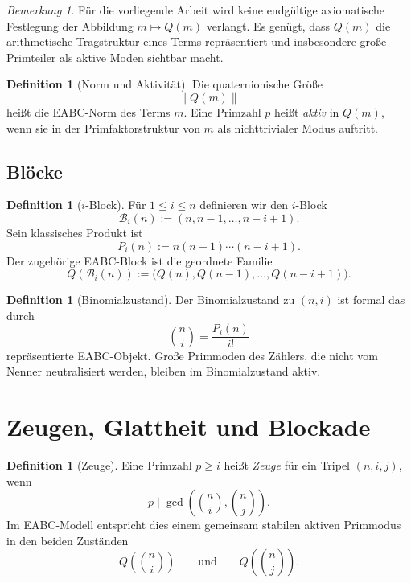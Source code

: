 \documentclass[12pt,a4paper]{article}
\theoremstyle{plain}
\theoremstyle{definition}
\newtheorem{definition}[theorem]{Definition}
\theoremstyle{remark}
\newtheorem{remark}[theorem]{Bemerkung}
\begin{document}
	\begin{remark}
		Für die vorliegende Arbeit wird keine endgültige axiomatische Festlegung der Abbildung \(m\mapsto Q(m)\) verlangt. Es genügt, dass \(Q(m)\) die arithmetische Tragstruktur eines Terms repräsentiert und insbesondere große Primteiler als aktive Moden sichtbar macht.
	\end{remark}
	
	\begin{definition}[Norm und Aktivität]
		Die quaternionische Größe
		\[
		\|Q(m)\|
		\]
		heißt die EABC-Norm des Terms \(m\). Eine Primzahl \(p\) heißt \emph{aktiv} in \(Q(m)\), wenn sie in der Primfaktorstruktur von \(m\) als nichttrivialer Modus auftritt.
	\end{definition}
	
	\subsection{Blöcke}
	
	\begin{definition}[\(i\)-Block]
		Für \(1\le i\le n\) definieren wir den \(i\)-Block
		\[
		\mathcal B_i(n):=(n,n-1,\dots,n-i+1).
		\]
		Sein klassisches Produkt ist
		\[
		P_i(n):=n(n-1)\cdots(n-i+1).
		\]
		Der zugehörige EABC-Block ist die geordnete Familie
		\[
		Q(\mathcal B_i(n)):=\bigl(Q(n),Q(n-1),\dots,Q(n-i+1)\bigr).
		\]
	\end{definition}
	
	\begin{definition}[Binomialzustand]
		Der Binomialzustand zu \((n,i)\) ist formal das durch
		\[
		\binom{n}{i}=\frac{P_i(n)}{i!}
		\]
		repräsentierte EABC-Objekt. Große Primmoden des Zählers, die nicht vom Nenner neutralisiert werden, bleiben im Binomialzustand aktiv.
	\end{definition}
	
	\section{Zeugen, Glattheit und Blockade}
	
	\begin{definition}[Zeuge]
		Eine Primzahl \(p\ge i\) heißt \emph{Zeuge} für ein Tripel \((n,i,j)\), wenn
		\[
		p \mid \gcd\!\left(\binom{n}{i},\binom{n}{j}\right).
		\]
		Im EABC-Modell entspricht dies einem gemeinsam stabilen aktiven Primmodus in den beiden Zuständen
		\[
		Q\!\left(\binom{n}{i}\right)
		\qquad\text{und}\qquad
		Q\!\left(\binom{n}{j}\right).
		\]
	\end{definition}
	
\end{document}
